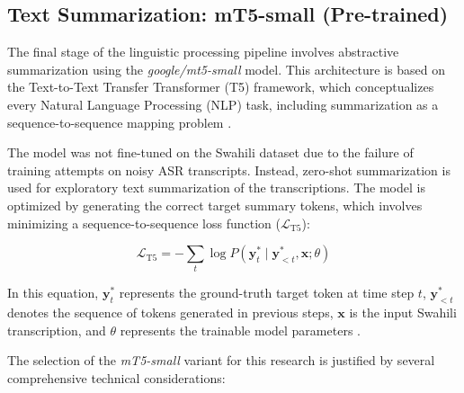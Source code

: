 \subsection{Text Summarization: mT5-small (Pre-trained)}
The final stage of the linguistic processing pipeline involves abstractive summarization using the \textit{google/mt5-small} model. This architecture is based on the Text-to-Text Transfer Transformer (T5) framework, which conceptualizes every Natural Language Processing (NLP) task, including summarization as a sequence-to-sequence mapping problem \citep{DHAHBI2025100615}. 

The model was not fine-tuned on the Swahili dataset due to the failure of training attempts on noisy ASR transcripts. Instead, zero-shot summarization is used for exploratory text summarization of the transcriptions. The model is optimized by generating the correct target summary tokens, which involves minimizing a sequence-to-sequence loss function ($\mathcal{L}_{\text{T5}}$):

\begin{equation}
    \mathcal{L}_{\text{T5}} = - \sum_{t} \log P(\mathbf{y}_t^* \mid \mathbf{y}_{<t}^*, \mathbf{x}; \theta)
\end{equation}

In this equation, $\mathbf{y}_t^*$ represents the ground-truth target token at time step $t$, $\mathbf{y}_{<t}^*$ denotes the sequence of tokens generated in previous steps, $\mathbf{x}$ is the input Swahili transcription, and $\theta$ represents the trainable model parameters \citep{DHAHBI2025100615}.

The selection of the \textit{mT5-small} variant for this research is justified by several comprehensive technical considerations:

